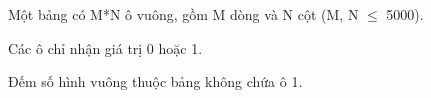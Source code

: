 Một bảng có M*N ô vuông, gồm M dòng và N cột (M, N  $\le$  5000).  

   Các ô chỉ nhận giá trị 0 hoặc 1.  

   Đếm số hình vuông thuộc bảng không chứa ô 1.  

\